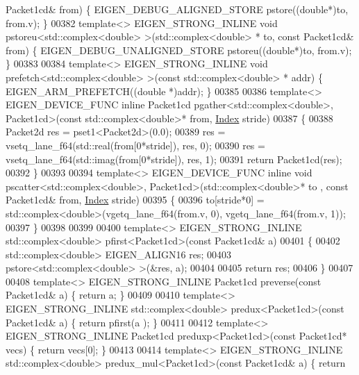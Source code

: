 \begin{DoxyCode}
      Packet1cd& from) \{ EIGEN\_DEBUG\_ALIGNED\_STORE pstore((\textcolor{keywordtype}{double}*)to, from.v); \}
00382 \textcolor{keyword}{template}<> EIGEN\_STRONG\_INLINE \textcolor{keywordtype}{void} pstoreu<std::complex<double> >(std::complex<double> *   to, \textcolor{keyword}{const} 
      Packet1cd& from) \{ EIGEN\_DEBUG\_UNALIGNED\_STORE pstoreu((\textcolor{keywordtype}{double}*)to, from.v); \}
00383 
00384 \textcolor{keyword}{template}<> EIGEN\_STRONG\_INLINE \textcolor{keywordtype}{void} prefetch<std::complex<double> >(\textcolor{keyword}{const} std::complex<double> *   addr) \{ 
      EIGEN\_ARM\_PREFETCH((\textcolor{keywordtype}{double} *)addr); \}
00385 
00386 \textcolor{keyword}{template}<> EIGEN\_DEVICE\_FUNC \textcolor{keyword}{inline} Packet1cd pgather<std::complex<double>, Packet1cd>(\textcolor{keyword}{const} 
      std::complex<double>* from, \hyperlink{namespace_eigen_a62e77e0933482dafde8fe197d9a2cfde}{Index} stride)
00387 \{
00388   Packet2d res = pset1<Packet2d>(0.0);
00389   res = vsetq\_lane\_f64(std::real(from[0*stride]), res, 0);
00390   res = vsetq\_lane\_f64(std::imag(from[0*stride]), res, 1);
00391   \textcolor{keywordflow}{return} Packet1cd(res);
00392 \}
00393 
00394 \textcolor{keyword}{template}<> EIGEN\_DEVICE\_FUNC \textcolor{keyword}{inline} \textcolor{keywordtype}{void} pscatter<std::complex<double>, Packet1cd>(std::complex<double>* to
      , \textcolor{keyword}{const} Packet1cd& from, \hyperlink{namespace_eigen_a62e77e0933482dafde8fe197d9a2cfde}{Index} stride)
00395 \{
00396   to[stride*0] = std::complex<double>(vgetq\_lane\_f64(from.v, 0), vgetq\_lane\_f64(from.v, 1));
00397 \}
00398 
00399 
00400 \textcolor{keyword}{template}<> EIGEN\_STRONG\_INLINE std::complex<double>  pfirst<Packet1cd>(\textcolor{keyword}{const} Packet1cd& a)
00401 \{
00402   std::complex<double> EIGEN\_ALIGN16 res;
00403   pstore<std::complex<double> >(&res, a);
00404 
00405   \textcolor{keywordflow}{return} res;
00406 \}
00407 
00408 \textcolor{keyword}{template}<> EIGEN\_STRONG\_INLINE Packet1cd preverse(\textcolor{keyword}{const} Packet1cd& a) \{ \textcolor{keywordflow}{return} a; \}
00409 
00410 \textcolor{keyword}{template}<> EIGEN\_STRONG\_INLINE std::complex<double> predux<Packet1cd>(\textcolor{keyword}{const} Packet1cd& a) \{ \textcolor{keywordflow}{return} pfirst(a
      ); \}
00411 
00412 \textcolor{keyword}{template}<> EIGEN\_STRONG\_INLINE Packet1cd preduxp<Packet1cd>(\textcolor{keyword}{const} Packet1cd* vecs) \{ \textcolor{keywordflow}{return} vecs[0]; \}
00413 
00414 \textcolor{keyword}{template}<> EIGEN\_STRONG\_INLINE std::complex<double> predux\_mul<Packet1cd>(\textcolor{keyword}{const} Packet1cd& a) \{ \textcolor{keywordflow}{return} 

\end{DoxyCode}
